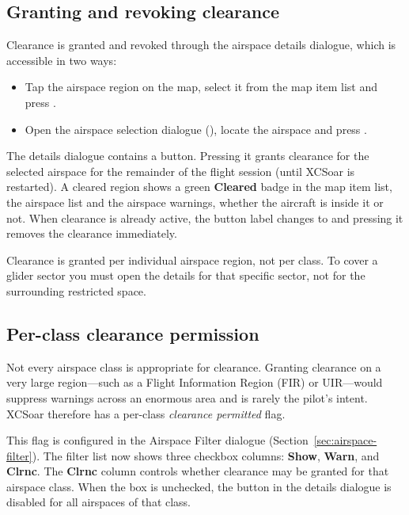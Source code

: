 \subsection*{Granting and revoking clearance}

Clearance is granted and revoked through the airspace details
dialogue, which is accessible in two ways:
\begin{itemize}
\item Tap the airspace region on the map, select it from the map item
  list and press .
\item Open the airspace selection dialogue
  (\blink{}), locate the airspace and
  press .
\end{itemize}

The details dialogue contains a  button.
Pressing it grants clearance for the selected airspace for the
remainder of the flight session (until XCSoar is restarted).  A
cleared region shows a green \textbf{Cleared} badge in the map item
list, the airspace list and the airspace warnings, whether the
aircraft is inside it or not.  When
clearance is already active, the button label changes to
 and pressing it removes the clearance
immediately.

\tip Clearance is granted per individual airspace region, not per
class.  To cover a glider sector you must open the details for that
specific sector, not for the surrounding restricted space.

\subsection*{Per-class clearance permission}

Not every airspace class is appropriate for clearance.  Granting
clearance on a very large region---such as a Flight Information Region
(FIR) or UIR---would suppress warnings across an enormous area and is
rarely the pilot's intent.  XCSoar therefore has a per-class
\emph{clearance permitted} flag.

This flag is configured in the Airspace Filter dialogue
(Section~\ref{sec:airspace-filter}).  The filter list now shows three
checkbox columns: \textbf{Show}, \textbf{Warn}, and \textbf{Clrnc}.
The \textbf{Clrnc} column controls whether clearance may be granted
for that airspace class.  When the box is unchecked, the
 button in the details dialogue is disabled for
all airspaces of that class.

